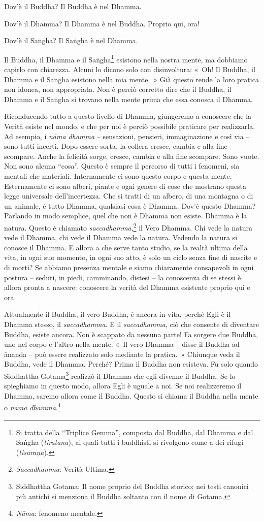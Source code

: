 Dov'è il Buddha? Il Buddha è nel Dhamma.

Dov'è il Dhamma? Il Dhamma è nel Buddha. Proprio qui, ora!

Dov'è il Saṅgha? Il Saṅgha è nel Dhamma.

Il Buddha, il Dhamma e il Saṅgha\footnote{Si tratta della ``Triplice
  Gemma'', composta dal Buddha, dal Dhamma e dal Saṅgha
  (\emph{tiratana}), ai quali tutti i buddhisti si rivolgono come a dei
  rifugi (\emph{tisaraṇa}).} esistono nella nostra mente, ma dobbiamo
capirlo con chiarezza. Alcuni lo dicono solo con disinvoltura: «~Oh! Il
Buddha, il Dhamma e il Saṅgha esistono nella mia mente.~» Già questo
rende la loro pratica non idonea, non appropriata. Non è perciò corretto
dire che il Buddha, il Dhamma e il Saṅgha si trovano nella mente prima
che essa conosca il Dhamma.

Riconducendo tutto a questo livello di Dhamma, giungeremo a conoscere
che la Verità esiste nel mondo, e che per noi è perciò possibile
praticare per realizzarla. Ad esempio, i \emph{nāma dhamma} --
sensazioni, pensieri, immaginazione e così via -- sono tutti incerti.
Dopo essere sorta, la collera cresce, cambia e alla fine scompare. Anche
la felicità sorge, cresce, cambia e alla fine scompare. Sono vuote. Non
sono alcuna ``cosa''. Questo è sempre il percorso di tutti i fenomeni,
sia mentali che materiali. Internamente ci sono questo corpo e questa
mente. Esternamente ci sono alberi, piante e ogni genere di cose che
mostrano questa legge universale dell'incertezza. Che si tratti di un
albero, di una montagna o di un animale, è tutto Dhamma, qualsiasi cosa
è Dhamma. Dov'è questo Dhamma? Parlando in modo semplice, quel che non è
Dhamma non esiste. Dhamma è la natura. Questo è chiamato
\emph{saccadhamma},\footnote{\emph{Saccadhamma}: Verità Ultima.}
il Vero Dhamma. Chi vede la natura vede il Dhamma, chi
vede il Dhamma vede la natura. Vedendo la natura si conosce il Dhamma. E
allora a che serve tanto studio, se la realtà ultima della vita, in ogni
suo momento, in ogni suo atto, è solo un ciclo senza fine di nascite e
di morti? Se abbiamo presenza mentale e siamo chiaramente consapevoli in
ogni postura -- seduti, in piedi, camminando, distesi -- la conoscenza
di se stessi è allora pronta a nascere: conoscere la verità del Dhamma
esistente proprio qui e ora.

Attualmente il Buddha, il vero Buddha, è ancora in vita, perché Egli è
il Dhamma stesso, il \emph{saccadhamma}. E il \emph{saccadhamma}, ciò
che consente di diventare Buddha, esiste ancora. Non è scappato da
nessuna parte! Fa sorgere due Buddha, uno nel corpo e l'altro nella
mente. «~Il vero Dhamma -- disse il Buddha ad ānanda -- può essere
realizzato solo mediante la pratica.~» Chiunque veda il Buddha, vede il
Dhamma. Perché? Prima il Buddha non esisteva. Fu solo quando Siddhattha
Gotama\footnote{Siddhattha Gotama: Il nome proprio del Buddha storico;
  nei testi canonici più antichi si menziona il Buddha soltanto con il
  nome di Gotama.} realizzò il Dhamma che egli divenne il Buddha. Se lo
spieghiamo in questo modo, allora Egli è uguale a noi. Se noi
realizzeremo il Dhamma, saremo allora come il Buddha. Questo si chiama
il Buddha nella mente o \emph{nāma dhamma}.\footnote{\emph{Nāma}:
  fenomeno mentale.}

